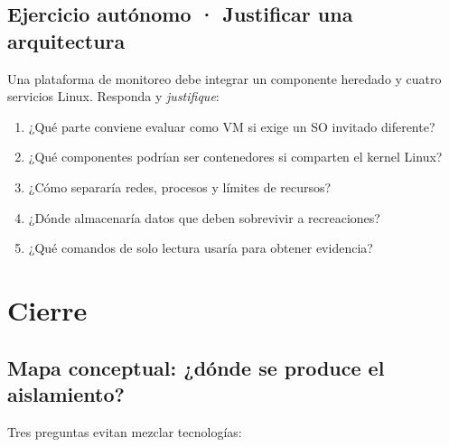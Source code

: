 \documentclass[11pt,a4paper]{article}
\begin{document}
\subsection*{Ejercicio autónomo · Justificar una arquitectura}

Una plataforma de monitoreo debe integrar un componente heredado y cuatro servicios Linux.
Responda y \emph{justifique}:

\begin{enumerate}[label=\textbf{\Alph*.}]
  \item ¿Qué parte conviene evaluar como VM si exige un SO invitado diferente?
  \item ¿Qué componentes podrían ser contenedores si comparten el kernel Linux?
  \item ¿Cómo separaría redes, procesos y límites de recursos?
  \item ¿Dónde almacenaría datos que deben sobrevivir a recreaciones?
  \item ¿Qué comandos de solo lectura usaría para obtener evidencia?
\end{enumerate}

\section{Cierre}

\subsection*{Mapa conceptual: ¿dónde se produce el aislamiento?}

Tres preguntas evitan mezclar tecnologías:

\begin{center}
\end{center}
\end{document}
